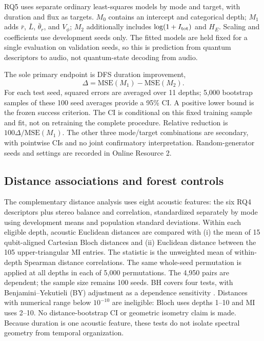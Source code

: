 \documentclass[pdflatex,iicol,sn-basic,Numbered]{sn-jnl}
\begin{document}
RQ5 uses separate ordinary least-squares models by mode and target, with duration and flux as targets. $M_0$ contains an intercept and categorical depth; $M_1$ adds $\bar r$, $\bar L$, $\bar\theta_r$, and $V_\phi$; $M_2$ additionally includes $\log(1+I_{\rm tot})$ and $H_E$. Scaling and coefficients use development seeds only. The fitted models are held fixed for a single evaluation on validation seeds, so this is prediction from quantum descriptors to audio, not quantum-state decoding from audio.

The sole primary endpoint is DFS duration improvement,
\begin{equation}
\Delta=\mathrm{MSE}(M_1)-\mathrm{MSE}(M_2).
\end{equation}
For each test seed, squared errors are averaged over 11 depths; 5,000 bootstrap samples of these 100 seed averages provide a 95\% CI. A positive lower bound is the frozen success criterion. The CI is conditional on this fixed training sample and fit, not on retraining the complete procedure. Relative reduction is $100\Delta/\mathrm{MSE}(M_1)$. The other three mode/target combinations are secondary, with pointwise CIs and no joint confirmatory interpretation. Random-generator seeds and settings are recorded in Online Resource 2.

\subsection{Distance associations and forest controls}
The complementary distance analysis uses eight acoustic features: the six RQ4 descriptors plus stereo balance and correlation, standardized separately by mode using development means and population standard deviations. Within each eligible depth, acoustic Euclidean distances are compared with (i) the mean of 15 qubit-aligned Cartesian Bloch distances and (ii) Euclidean distance between the 105 upper-triangular MI entries. The statistic is the unweighted mean of within-depth Spearman distance correlations. The same whole-seed permutation is applied at all depths in each of 5,000 permutations. The 4,950 pairs are dependent; the sample size remains 100 seeds. BH covers four tests, with Benjamini--Yekutieli (BY) adjustment as a dependence sensitivity \citep{Benjamini2001}. Distances with numerical range below $10^{-10}$ are ineligible: Bloch uses depths 1--10 and MI uses 2--10. No distance-bootstrap CI or geometric isometry claim is made. Because duration is one acoustic feature, these tests do not isolate spectral geometry from temporal organization.
\end{document}
